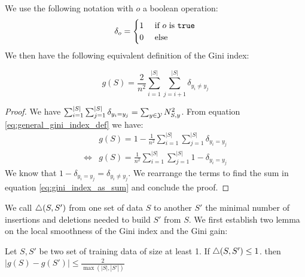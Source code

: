 We use the following notation with $o$ a boolean operation:
\begin{equation}
    \delta_o = \begin{cases}
        1 & \text{ if $o$ is \texttt{true}}\\
        0 & \text{ else}
    \end{cases}
\end{equation}
We then have the following equivalent definition of the Gini index:
\begin{property}
    \begin{equation}\label{eq:gini_index_as_sum}
        g(S) = \frac{2}{n^2} \sum_{i=1}^{|S|}\sum_{j=i+1}^{|S|} \delta_{y_i \neq y_j}
    \end{equation}
\end{property}
\begin{proof}
    We have $\sum_{i=1}^{|S|}\sum_{j=1}^{|S|} \delta_{y_i = y_j} = \sum_{y \in \mathcal{Y}} N_{S,y}^2$. From equation \ref{eq:general_gini_index_def} we have:
    \begin{equation*}
        \begin{split}
            & g(S) = 1 - \frac{1}{n^2} \sum_{i=1}^{|S|}\sum_{j=1}^{|S|} \delta_{y_i = y_j}\\
            \Leftrightarrow & g(S) = \frac{1}{n^2} \sum_{i=1}^{|S|}\sum_{j=1}^{|S|} 1 - \delta_{y_i = y_j}
        \end{split}
    \end{equation*}
    We know that $1 - \delta_{y_i = y_j} = \delta_{y_i \neq y_j}$. We rearrange the terms to find the sum in equation \ref{eq:gini_index_as_sum} and conclude the proof.
\end{proof}

We call  $\triangle(S, S')$ from one set of data $S$ to another $S'$ the minimal number of insertions and deletions needed to build $S'$ from $S$. We first establish two lemma on the local smoothness of the Gini index and the Gini gain:
\begin{lemma}\label{lem:local_gini_index_smoothness}
    Let $S, S'$ be two set of training data of size at least 1. If $\triangle(S, S') \leq 1$. then $|g(S) - g(S')| \leq \frac{2}{\max(|S|, |S'|)}$
\end{lemma}

